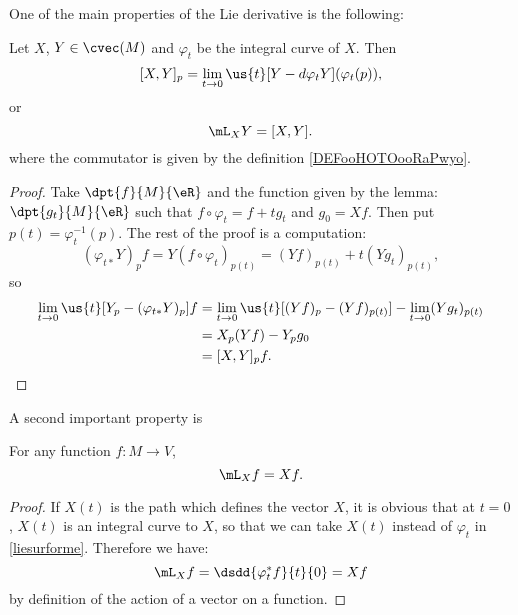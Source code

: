 One of the main properties of the Lie derivative is the following:
\begin{theorem}		\label{ThoLieDerrComm}
	Let $X$, $Y\in\cvec(M)$ and $\varphi_t$ be the integral curve of $X$. Then
	\[
		[X,Y]_p=\lim_{t\to 0}\us{t}[Y-d\varphi_tY](\varphi_t(p)),
	\]
	or
	\begin{equation}
		\mL_XY=[X,Y].
	\end{equation}
	where the commutator is given by the definition \ref{DEFooHOTOooRaPwyo}.
\end{theorem}
\begin{proof}
	Take $\dpt{f}{M}{\eR}$ and the function given by the lemma: $\dpt{g_t}{M}{\eR}$ such that $f\circ \varphi_t=f+tg_t$ and $g_0=Xf$. Then put $p(t)=\varphi_t^{-1}(p)$. The rest of the proof is a computation:
	\[
		(\varphi_{t*}Y)_pf=Y(f\circ\varphi_t)_{p(t)}=(Yf)_{p(t)}+t(Yg_t)_{p(t)},
	\]
	so
	\begin{equation}
		\begin{split}
			\lim_{t\to 0}\us{t}[Y_p-(\varphi_{t*}Y)_p]f&=\lim_{t\to 0}\us{t}[(Yf)_p-(Yf)_{p(t)}]-\lim_{t\to 0}(Yg_t)_{p(t)}\\
			&=X_p(Yf)-Y_pg_0\\
			&=[X,Y]_pf.
		\end{split}
	\end{equation}

\end{proof}

A second important property is
\begin{theorem}
	For any function $f\colon M\to V$,
	\[
		\mL_Xf=Xf.
	\]
\end{theorem}

\begin{proof}
	If $X(t)$ is the path which defines the vector $X$, it is obvious that at $t=0$, $X(t)$ is an integral curve to $X$, so that we can take $X(t)$ instead of $\varphi_t$ in \eqref{liesurforme}. Therefore we have:
	\begin{equation}
		\mL_Xf=\dsdd{\varphi_t^*f}{t}{0}
		=Xf
	\end{equation}
	by definition of the action of a vector on a function.
\end{proof}

